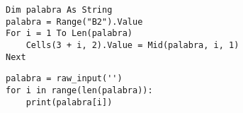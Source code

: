 \vfill


\bgncolumns

\centering {}
\begin{lstlisting}[style=vba]
Dim palabra As String
palabra = Range("B2").Value
For i = 1 To Len(palabra)
    Cells(3 + i, 2).Value = Mid(palabra, i, 1)
Next
\end{lstlisting}

\centering {}
\begin{lstlisting}[style=frame03]
palabra = raw_input('')
for i in range(len(palabra)):
    print(palabra[i])
\end{lstlisting}

\trmcolumns

